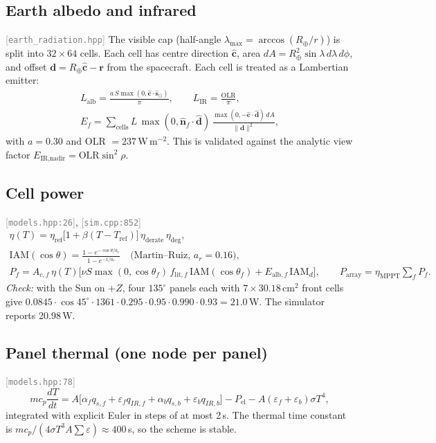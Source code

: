 \documentclass[11pt,a4paper]{article}
\newcommand{\vb}[1]{\boldsymbol{#1}}
\newcommand{\uv}[1]{\hat{\boldsymbol{#1}}}
\newcommand{\src}[1]{\textcolor{gray}{\small[\texttt{#1}]}}
\begin{document}
\subsection{Earth albedo and infrared} \src{earth\_radiation.hpp}
The visible cap (half-angle $\lambda_{\max} = \arccos(R_\oplus/r)$) is split into $32\times64$ cells. Each cell has centre direction $\uv c$, area $dA = R_\oplus^2\sin\lambda\,d\lambda\,d\phi$, and offset $\vb d = R_\oplus\uv c - \vb r$ from the spacecraft. Each cell is treated as a Lambertian emitter:
\begin{gather}
L_{\text{alb}} = \frac{a\,S\max(0, \uv c\cdot\uv s_\odot)}{\pi},\qquad L_{\text{IR}} = \frac{\text{OLR}}{\pi},\\
E_f = \sum_{\text{cells}} L\,\max(0, \uv n_f\cdot\uv d)\,\frac{\max(0, -\uv c\cdot\uv d)\,dA}{\lVert\vb d\rVert^2},
\end{gather}
with $a = 0.30$ and OLR $= 237$\,W\,m$^{-2}$. This is validated against the analytic view factor $E_{\text{IR,nadir}} = \text{OLR}\sin^2\rho$.

\subsection{Cell power} \src{models.hpp:26}, \src{sim.cpp:852}
\begin{gather}
\eta(T) = \eta_{\text{ref}}\big[1 + \beta(T - T_{\text{ref}})\big]\,\eta_{\text{derate}}\,\eta_{\text{deg}},\\
\text{IAM}(\cos\theta) = \frac{1 - e^{-\cos\theta/a_r}}{1 - e^{-1/a_r}} \quad\text{(Martin--Ruiz, } a_r = 0.16),\\
P_f = A_{c,f}\,\eta(T)\Big[\nu S\max(0,\cos\theta_f)\,f_{\text{lit},f}\,\text{IAM}(\cos\theta_f) + E_{\text{alb},f}\,\text{IAM}_d\Big],\qquad P_{\text{array}} = \eta_{\text{MPPT}}\sum_f P_f .
\end{gather}
\emph{Check:} with the Sun on $+Z$, four $135^\circ$ panels each with $7\times30.18$\,cm$^2$ front cells give $0.0845\cdot\cos45^\circ\cdot1361\cdot0.295\cdot0.95\cdot0.990\cdot0.93 = 21.0$\,W. The simulator reports 20.98\,W.

\subsection{Panel thermal (one node per panel)} \src{models.hpp:78}
\begin{equation}
m c_p\frac{dT}{dt} = A\big[\alpha_f q_{s,f} + \varepsilon_f q_{IR,f} + \alpha_b q_{s,b} + \varepsilon_b q_{IR,b}\big] - P_{\text{el}} - A(\varepsilon_f + \varepsilon_b)\sigma T^4,
\end{equation}
integrated with explicit Euler in steps of at most 2\,s. The thermal time constant is $m c_p/(4\sigma T^3 A\sum\varepsilon) \approx 400$\,s, so the scheme is stable.
\end{document}
